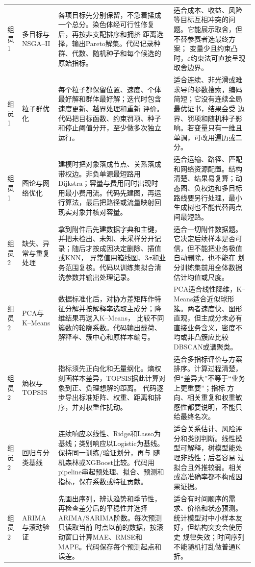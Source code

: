 \begin{longtable}{p{1.25cm}p{2.55cm}p{6.25cm}p{5.45cm}}
组员1 & 多目标与NSGA--II
& 各项目标先分别保留，不急着揉成一个总分。染色体经可行性修复后，再按非支配排序和拥挤
距离选择，输出Pareto解集。代码记录种群、代数、随机种子和每个候选的原始指标。
& 适合成本、收益、风险等目标互相冲突的问题。它能展示取舍，但不替参赛者选最终方案；
变量少且约束凸时，$\varepsilon$约束法可直接呈现取舍边界。\\

组员1 & 粒子群优化
& 每个粒子都保留位置、速度、个体最好解和群体最好解；迭代时包含速度更新、越界处理和重新
评价。代码把目标函数、约束罚项、种子和停止阈值分开，至少做多次独立运行。
& 适合连续、非光滑或难求导的参数搜索，编码简短；它没有连续全局最优证书，结果会受
边界、罚项和随机种子影响。若变量只有一维且单调，可改用遍历或二分。\\

组员1 & 图论与网络优化
& 建模时把对象落成节点、关系落成带权边。非负单源最短路用Dijkstra；容量与费用同时出现时
用最小费用流。代码先建图，再运行算法，最后把路径或流量映射回现实对象并核对容量。
& 适合运输、路径、匹配和网络资源配置。结构清楚、结果易复算；动态图、负权边和多目标
路线要另行处理，最小生成树也不能代替两点间最短路。\\

组员2 & 缺失、异常与重复处理
& 拿到附件后先建数据字典和主键，并把未检出、未知、未采样分开记录；随后才按成因决定删除、插值或KNN，
异常值用箱线图、$3\sigma$和业务范围复核。代码以训练集拟合清洗参数并输出处理记录。
& 适合一切附件数据题。它决定后续样本是否可信，但不能把业务极值自动删除，也不能在
划分训练集前用全体数据估计均值或尺度。\\

组员2 & PCA与K--Means
& 数据标准化后，对协方差矩阵作特征分解并按解释率选取主成分；降维结果再送入K--Means，
比较不同簇数的轮廓系数。代码输出载荷、解释率、簇中心和原样本编号。
& PCA适合线性降维，K--Means适合近似球形簇。两者速度快、图形直观，但主成分未必有
直接业务含义，密度不均或非凸簇应比较DBSCAN或谱聚类。\\

组员2 & 熵权与TOPSIS
& 指标须先正向化和无量纲化。熵权刻画样本差异，TOPSIS据此计算对象到正、负理想解的距离。
代码逐步导出标准矩阵、权重、距离和排序，并对权重作扰动。
& 适合多指标评价与方案排序。计算过程清楚，但“差异大”不等于“业务上更重要”；指标
方向、相关重复和权重敏感性都要说明，不能只给最终名次。\\

组员2 & 回归与分类基线
& 连续响应以线性、Ridge和Lasso为基线；类别响应以Logistic为基线。保持同一训练/验证划分，再与
随机森林或XGBoost比较。代码用pipeline串起预处理、拟合、预测和指标，保存系数或特征贡献。
& 适合关系估计、风险评分和类别判断。线性模型可解释，树模型能处理非线性；后者容易
过拟合且外推较弱。相关或高准确率都不构成因果证据。\\

组员2 & ARIMA与滚动验证
& 先画出序列，辨认趋势和季节性，再检查差分后的平稳性并选择ARIMA/SARIMA阶数。每次预测只读取当前
时点以前的数据，按滚动窗口计算MAE、RMSE和MAPE。代码保存每个预测起点和误差。
& 适合有时间顺序的需求、价格和状态预测。统计模型对中小样本友好，但结构突变会使历史
规律失效；时间序列不能随机打乱做普通K折。\\
\end{longtable}
\normalsize

